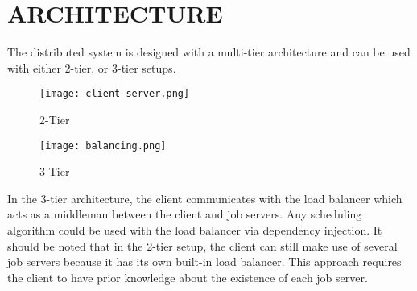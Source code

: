 \section{ARCHITECTURE}\label{sec:architecture}

The distributed system is designed with a multi-tier
architecture and can be used with either 2-tier, or 3-tier
setups.

\begin{figure}[H]
    \centering
    \texttt{[image: client-server.png]}
    \caption{2-Tier}
\end{figure}

\begin{figure}[H]
    \centering
    \texttt{[image: balancing.png]}
    \caption{3-Tier}
\end{figure}

In the 3-tier architecture, the client communicates with the load balancer
which acts as a middleman between the client and job servers.
Any scheduling algorithm could be used with the load balancer via
dependency injection.
It should be noted that in the 2-tier setup, the client can still make use
of several job servers because it has its own built-in load balancer.
This approach requires the client to have prior knowledge about
the existence of each job server.
